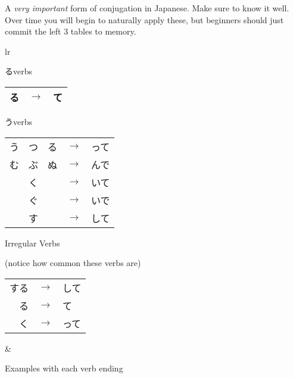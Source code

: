     {
    A \textit{very important} form of conjugation in Japanese. Make sure to know it well. Over time you will begin to naturally apply these, but beginners should just commit the left 3 tables to memory.

   \begin{tabular}{lr}
        \begin{minipage}[b]{0.45\linewidth}
        るverbs

        \begin{tabular}{|ccc|}
            \hline
            る & $\rightarrow$ & て \\
            \hline
        \end{tabular}

        \vspace{1mm}
        うverbs

        \begin{tabular}{|ccc|}
            \hline
            う　つ　る & $\rightarrow$ & って \\
            む　ぶ　ぬ & $\rightarrow$ & んで \\ 
            く         & $\rightarrow$ & いて \\ 
            ぐ         & $\rightarrow$ & いで \\ 
            す         & $\rightarrow$ & して \\ 
            \hline
        \end{tabular}

        \vspace{1mm}
        Irregular Verbs

        (notice how common these verbs are)

        \begin{tabular}{|rcl|}
            \hline
            する & $\rightarrow$ & して \\
            \ruby{来}{き}る & $\rightarrow$ & \ruby{来}{き}て \\
            \ruby{行}{い}く & $\rightarrow$ & \ruby{行}{い}って \\
            \hline
        \end{tabular}
        \end{minipage}
    &
        \begin{minipage}[b]{0.45\linewidth}
        Examples with each verb ending


\end{minipage}
\end{tabular}}
